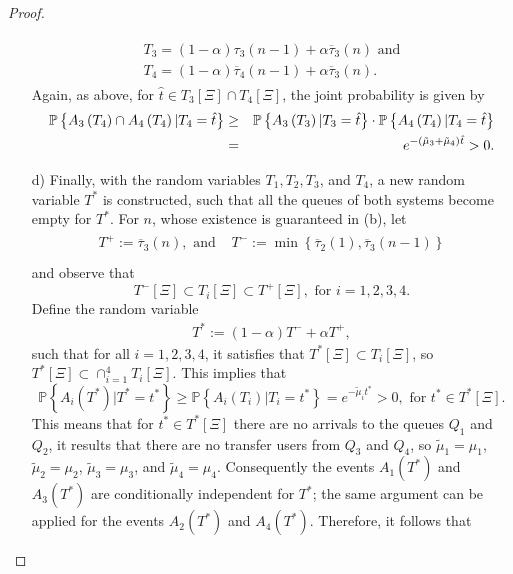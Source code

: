 \documentclass{article}
\newcommand{\prob}{\mathbb{P}}
\begin{document}
\begin{proof}
\begin{itemize}
\begin{eqnarray}
\begin{array}{l}
T_{3}=\left(1-\alpha\right)\tau_{3}\left(n-1\right)
+\alpha\overline{\tau}_{3}\left(n\right)\textrm{ and}\\
T_{4}=\left(1-\alpha\right)\overline{\tau}_{4}\left(n-1\right)+\alpha
\overline{\tau}_{3}\left(n\right).
\end{array}
\end{eqnarray}
Again, as above, for $\hat{t}\in  T_{3}\left[\Xi\right]\cap T_{4}\left[\Xi\right]$, the joint probability is given by
\begin{eqnarray*}\medskip
\prob\left\{A_{3}\left(T_{4}\right)\cap
A_{4}\left(T_{4}\right)|T_{4}=\hat{t}\right\}&\geq&
\prob\left\{A_{3}\left(T_{3}\right)|T_{3}=\hat{t}\right\}\cdot
\prob\left\{A_{4}\left(T_{4}\right)|T_{4}=\hat{t}\right\}\\
&=&e^{-\left(\tilde{\mu}_{3}+\tilde{\mu}_{4}\right)\hat{t}}>0.
\end{eqnarray*}%
\item[d)] Finally, with the random variables $T_{1},T_{2},T_{3}$, and $T_{4}$, a new random variable $T^{*}$ is constructed, such that all the queues of both systems become empty for $T^{*}$. For $n$, whose existence is guaranteed in (b), let
\begin{eqnarray}
\begin{array}{lc}
T^{+}:=\overline{\tau}_{3}\left(n\right),\textrm{ and }&
T^{-}:=\min\left\{\overline{\tau}_{2}\left(1\right),\overline{\tau}_{3}\left(n-1\right)\right\}\\
\end{array}
\end{eqnarray}
and observe that  $$T^{-}\left[\Xi\right]\subset T_{i}\left[\Xi\right]\subset T^{+}\left[\Xi\right],\textrm{ for }i=1,2,3,4.$$
Define the random variable
\begin{eqnarray}
T^{*}:=\left(1-\alpha\right)T^{-}+\alpha T^{+},
\end{eqnarray}
such that for all $i=1,2,3,4$, it satisfies that $T^{*}\left[\Xi\right]\subset T_{i}\left[\Xi\right]$, so  $T^{*}\left[\Xi\right]\subset \cap_{i=1}^{4}T_{i}\left[\Xi\right]$. This implies that
\begin{equation}
\prob\left\{A_{i}\left(T^{*}\right)|T^{*}=t^{*}\right\}\geq\prob\left\{A_{i}\left(T_{i}\right)|T_{i}=t^{*}\right\}=e^{-\tilde{\mu}_{i}t^{*}}>0,\textrm{ for }t^{*}\in T^{*}\left[\Xi\right].
\end{equation}
This means that for $t^{*}\in T^{*}\left[\Xi\right]$ there are no arrivals to the queues $Q_{1}$ and $Q_{2}$, it results that there are no transfer users from $Q_{3}$ and $Q_{4}$, so $\tilde{\mu}_{1}=\mu_{1}$, $\tilde{\mu}_{2}=\mu_{2}$, $\tilde{\mu}_{3}=\mu_{3}$, and $\tilde{\mu}_{4}=\mu_{4}$. Consequently the events $A_{1}\left(T^{*}\right)$ and $A_{3}\left(T^{*}\right)$ are conditionally independent for $T^{*}$; the same argument can be applied for the events $A_{2}\left(T^{*}\right)$ and $A_{4}\left(T^{*}\right)$. Therefore, it follows that

\end{itemize}
\end{proof}
\end{document}
